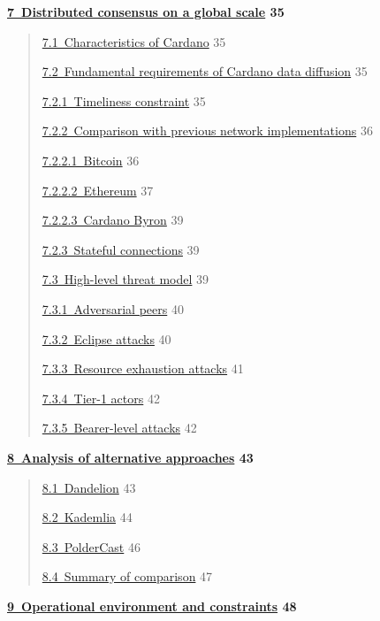 \documentclass[]{article}
\begin{document}
\textbf{\protect\hyperlink{distributed-consensus-on-a-global-scale}{​7​~Distributed
consensus on a global scale} 35}

\begin{quote}
\protect\hyperlink{characteristics-of-cardano}{​7.1​~Characteristics of
Cardano} 35

\protect\hyperlink{fundamental-requirements-of-cardano-data-diffusion}{​7.2​~Fundamental
requirements of Cardano data diffusion} 35

\protect\hyperlink{timeliness-constraint}{​7.2.1​~Timeliness constraint}
35

\protect\hyperlink{comparison-with-previous-network-implementations}{​7.2.2​~Comparison
with previous network implementations} 36

\protect\hyperlink{bitcoin}{​7.2.2.1​~Bitcoin} 36

\protect\hyperlink{ethereum}{​7.2.2.2​~Ethereum} 37

\protect\hyperlink{cardano-byron}{​7.2.2.3​~Cardano Byron} 39

\protect\hyperlink{stateful-connections}{​7.2.3​~Stateful connections}
39

\protect\hyperlink{high-level-threat-model}{​7.3​~High-level threat
model} 39

\protect\hyperlink{adversarial-peers}{​7.3.1​~Adversarial peers} 40

\protect\hyperlink{eclipse-attacks}{​7.3.2​~Eclipse attacks} 40

\protect\hyperlink{resource-exhaustion-attacks}{​7.3.3​~Resource
exhaustion attacks} 41

\protect\hyperlink{tier-1-actors}{​7.3.4​~Tier-1 actors} 42

\protect\hyperlink{bearer-level-attacks}{​7.3.5​~Bearer-level attacks}
42
\end{quote}

\textbf{\protect\hyperlink{analysis-of-alternative-approaches}{​8​~Analysis
of alternative approaches} 43}

\begin{quote}
\protect\hyperlink{dandelion}{​8.1​~Dandelion} 43

\protect\hyperlink{kademlia}{​8.2​~Kademlia} 44

\protect\hyperlink{poldercast-1}{​8.3​~PolderCast} 46

\protect\hyperlink{summary-of-comparison}{​8.4​~Summary of comparison}
47
\end{quote}

\textbf{\protect\hyperlink{operational-environment-and-constraints}{​9​~Operational
environment and constraints} 48}
\end{document}
